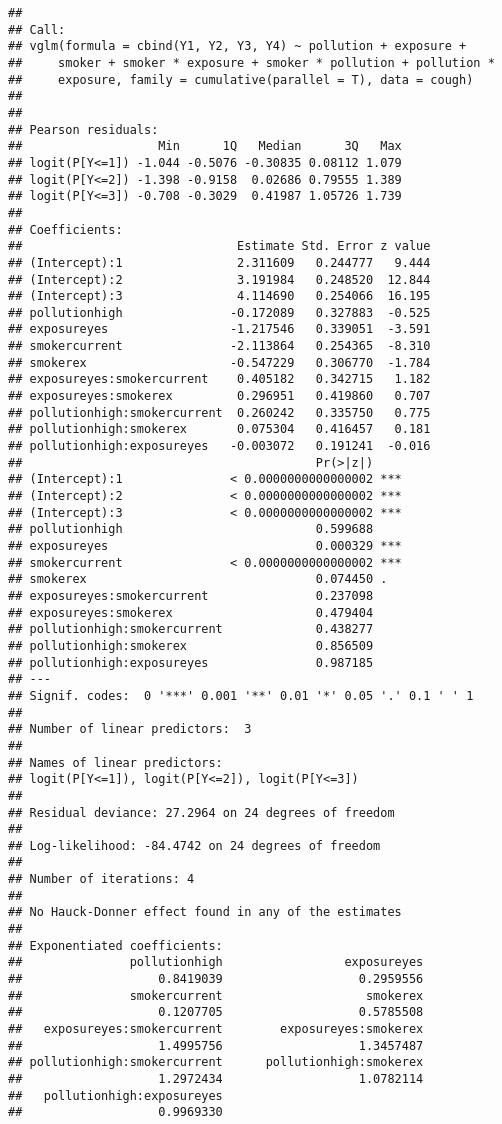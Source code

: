 \documentclass[]{article}
\begin{document}
\begin{verbatim}
## 
## Call:
## vglm(formula = cbind(Y1, Y2, Y3, Y4) ~ pollution + exposure + 
##     smoker + smoker * exposure + smoker * pollution + pollution * 
##     exposure, family = cumulative(parallel = T), data = cough)
## 
## 
## Pearson residuals:
##                   Min      1Q   Median      3Q   Max
## logit(P[Y<=1]) -1.044 -0.5076 -0.30835 0.08112 1.079
## logit(P[Y<=2]) -1.398 -0.9158  0.02686 0.79555 1.389
## logit(P[Y<=3]) -0.708 -0.3029  0.41987 1.05726 1.739
## 
## Coefficients: 
##                              Estimate Std. Error z value
## (Intercept):1                2.311609   0.244777   9.444
## (Intercept):2                3.191984   0.248520  12.844
## (Intercept):3                4.114690   0.254066  16.195
## pollutionhigh               -0.172089   0.327883  -0.525
## exposureyes                 -1.217546   0.339051  -3.591
## smokercurrent               -2.113864   0.254365  -8.310
## smokerex                    -0.547229   0.306770  -1.784
## exposureyes:smokercurrent    0.405182   0.342715   1.182
## exposureyes:smokerex         0.296951   0.419860   0.707
## pollutionhigh:smokercurrent  0.260242   0.335750   0.775
## pollutionhigh:smokerex       0.075304   0.416457   0.181
## pollutionhigh:exposureyes   -0.003072   0.191241  -0.016
##                                         Pr(>|z|)    
## (Intercept):1               < 0.0000000000000002 ***
## (Intercept):2               < 0.0000000000000002 ***
## (Intercept):3               < 0.0000000000000002 ***
## pollutionhigh                           0.599688    
## exposureyes                             0.000329 ***
## smokercurrent               < 0.0000000000000002 ***
## smokerex                                0.074450 .  
## exposureyes:smokercurrent               0.237098    
## exposureyes:smokerex                    0.479404    
## pollutionhigh:smokercurrent             0.438277    
## pollutionhigh:smokerex                  0.856509    
## pollutionhigh:exposureyes               0.987185    
## ---
## Signif. codes:  0 '***' 0.001 '**' 0.01 '*' 0.05 '.' 0.1 ' ' 1
## 
## Number of linear predictors:  3 
## 
## Names of linear predictors: 
## logit(P[Y<=1]), logit(P[Y<=2]), logit(P[Y<=3])
## 
## Residual deviance: 27.2964 on 24 degrees of freedom
## 
## Log-likelihood: -84.4742 on 24 degrees of freedom
## 
## Number of iterations: 4 
## 
## No Hauck-Donner effect found in any of the estimates
## 
## Exponentiated coefficients:
##               pollutionhigh                 exposureyes 
##                   0.8419039                   0.2959556 
##               smokercurrent                    smokerex 
##                   0.1207705                   0.5785508 
##   exposureyes:smokercurrent        exposureyes:smokerex 
##                   1.4995756                   1.3457487 
## pollutionhigh:smokercurrent      pollutionhigh:smokerex 
##                   1.2972434                   1.0782114 
##   pollutionhigh:exposureyes 
##                   0.9969330
\end{verbatim}
\end{document}
